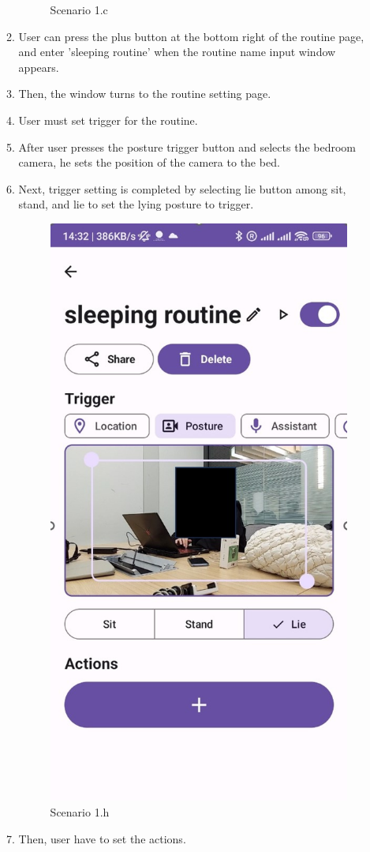 \begin{enumerate}
\begin{enumerate}
\begin{figure}
            \caption{Scenario 1.c}
            \label{fig:enter-label}
        \end{figure}
        \item User can press the plus button at the bottom right of the routine page, and enter 'sleeping routine' when the routine name input window appears. \\
        \item Then, the window turns to the routine setting page.\\
        \item User must set trigger for the routine. \\
        \item After user presses the posture trigger button and selects the bedroom camera, he sets the position of the camera to the bed. \\
        \item Next, trigger setting is completed by selecting lie button among sit, stand, and lie to set the lying posture to trigger.\\
        \begin{figure}
            \centering
            \includegraphics[width=0.5\linewidth]{imgs//usercase/usercase_scenario1_8.jpg}
            \caption{Scenario 1.h}
            \label{fig:enter-label}
        \end{figure}
        \item Then, user have to set the actions. \\

\end{enumerate}
\end{enumerate}
